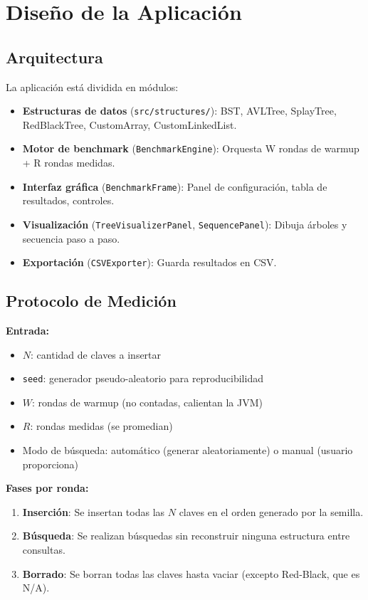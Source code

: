 \documentclass[12pt,a4paper]{article}
\begin{document}
\section{Diseño de la Aplicación}

\subsection{Arquitectura}

La aplicación está dividida en módulos:

\begin{itemize}
    \item \textbf{Estructuras de datos} (\texttt{src/structures/}): BST, AVLTree, SplayTree, RedBlackTree, CustomArray, CustomLinkedList.
    \item \textbf{Motor de benchmark} (\texttt{BenchmarkEngine}): Orquesta W rondas de warmup + R rondas medidas.
    \item \textbf{Interfaz gráfica} (\texttt{BenchmarkFrame}): Panel de configuración, tabla de resultados, controles.
    \item \textbf{Visualización} (\texttt{TreeVisualizerPanel}, \texttt{SequencePanel}): Dibuja árboles y secuencia paso a paso.
    \item \textbf{Exportación} (\texttt{CSVExporter}): Guarda resultados en CSV.
\end{itemize}

\subsection{Protocolo de Medición}

\textbf{Entrada:}
\begin{itemize}
    \item $N$: cantidad de claves a insertar
    \item \texttt{seed}: generador pseudo-aleatorio para reproducibilidad
    \item $W$: rondas de warmup (no contadas, calientan la JVM)
    \item $R$: rondas medidas (se promedian)
    \item Modo de búsqueda: automático (generar aleatoriamente) o manual (usuario proporciona)
\end{itemize}

\textbf{Fases por ronda:}
\begin{enumerate}
    \item \textbf{Inserción}: Se insertan todas las $N$ claves en el orden generado por la semilla.
    \item \textbf{Búsqueda}: Se realizan búsquedas sin reconstruir ninguna estructura entre consultas.
    \item \textbf{Borrado}: Se borran todas las claves hasta vaciar (excepto Red-Black, que es N/A).
\end{enumerate}
\end{document}
